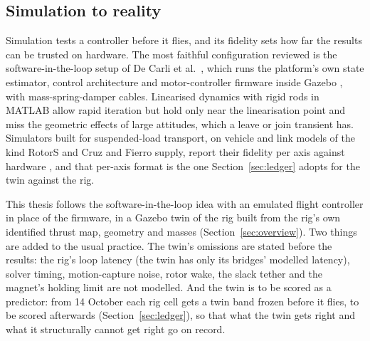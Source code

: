 
\subsection{Simulation to reality}
\label{sec:lit_sim}

Simulation tests a controller before it flies, and its fidelity sets how far the results can be trusted on
hardware. The most faithful configuration reviewed is the software-in-the-loop setup of De Carli et al.\
\cite{distributedNMPC}, which runs the platform's own state estimator, control architecture and motor-controller
firmware inside Gazebo \cite{koenig2004gazebo}, with mass-spring-damper cables. Linearised dynamics with rigid
rods in MATLAB \cite{DistributedMPC} allow rapid iteration but hold only near the linearisation point and miss the
geometric effects of large attitudes, which a leave or join transient has. Simulators built for suspended-load
transport, on vehicle and link models of the kind RotorS \cite{furrer2016rotors} and Cruz and Fierro
\cite{cruz2017cable} supply, report their fidelity per axis against hardware \cite{li2024rotortm}, and that per-axis
format is the one Section~\ref{sec:ledger} adopts for the twin against the rig.

This thesis follows the software-in-the-loop idea with an emulated flight controller in place of the firmware,
in a Gazebo twin of the rig built from the rig's own identified thrust map, geometry and masses
(Section~\ref{sec:overview}). Two things are added to the usual practice. The twin's omissions are stated before
the results: the rig's loop latency (the twin has only its bridges' modelled latency), solver timing, motion-capture noise, rotor wake, the slack tether and the magnet's
holding limit are not modelled. And the twin is to be scored as a predictor: from 14 October each rig cell gets a twin band frozen before it
flies, to be scored afterwards (Section~\ref{sec:ledger}), so that what the twin gets right and what it structurally
cannot get right go on record.
